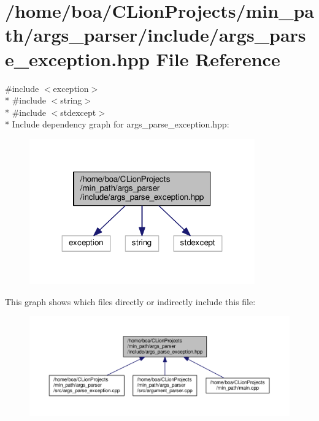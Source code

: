 \hypertarget{a00010}{}\section{/home/boa/\+C\+Lion\+Projects/min\+\_\+path/args\+\_\+parser/include/args\+\_\+parse\+\_\+exception.hpp File Reference}
\label{a00010}
{\ttfamily \#include $<$exception$>$}\\*
{\ttfamily \#include $<$string$>$}\\*
{\ttfamily \#include $<$stdexcept$>$}\\*
Include dependency graph for args\+\_\+parse\+\_\+exception.\+hpp\+:
\nopagebreak
\begin{figure}[H]
\begin{center}
\leavevmode
\includegraphics[width=275pt]{d8/d41/a00038}
\end{center}
\end{figure}
This graph shows which files directly or indirectly include this file\+:
\nopagebreak
\begin{figure}[H]
\begin{center}
\leavevmode
\includegraphics[width=350pt]{d3/de7/a00039}
\end{center}
\end{figure}
